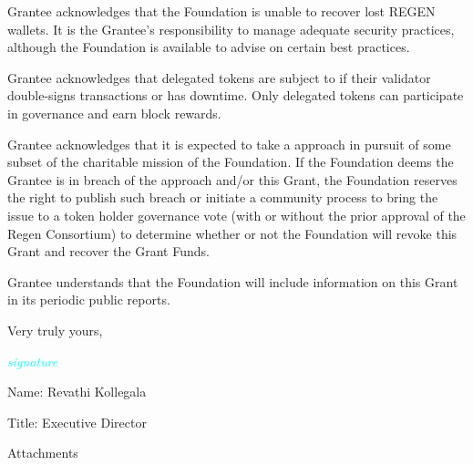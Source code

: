 \documentclass{article}
\begin{document}
Grantee acknowledges that the Foundation is unable to recover lost REGEN wallets. It is the Grantee’s responsibility to manage adequate security practices, although the Foundation is available to advise on certain best practices.
\par
Grantee acknowledges that delegated tokens are subject to  if their validator double-signs transactions or has downtime. Only delegated tokens can participate in governance and earn block rewards.
\par
Grantee acknowledges that it is expected to take a  approach in pursuit of some subset of the charitable mission of the Foundation. If the Foundation deems the Grantee is in breach of the  approach and/or this Grant, the Foundation reserves the right to publish such breach or initiate a community process to bring the issue to a token holder governance vote (with or without the prior approval of the Regen Consortium) to determine whether or not the Foundation will revoke this Grant and recover the Grant Funds.
\par
Grantee understands that the Foundation will include information on this Grant in its periodic public reports.
\par
\begin{flushright}
Very truly yours,
\par
\textcolor{cyan}{\emph{signature}}
\par
Name: Revathi Kollegala
\par
Title: Executive Director
\end{flushright}
\par
Attachments
\end{document}
